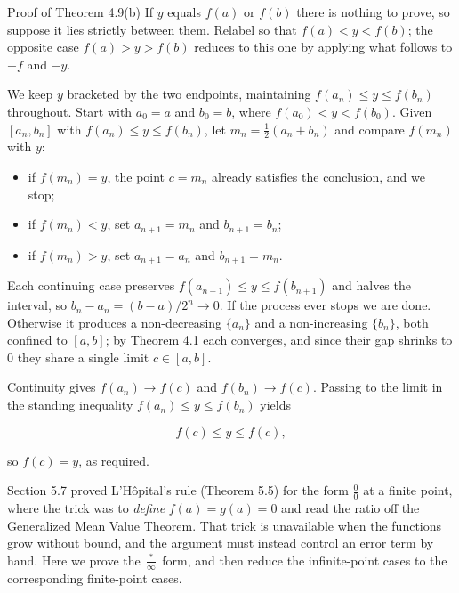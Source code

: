 \documentclass[a4paper,12pt,oneside]{memoir}
\begin{document}
\begin{envproof}{Proof of Theorem 4.9(b)}{}{}
If \(y\) equals \(f(a)\) or \(f(b)\) there is nothing to prove, so suppose it lies strictly between them. Relabel so that \(f(a) < y < f(b)\); the opposite case \(f(a) > y > f(b)\) reduces to this one by applying what follows to \(-f\) and \(-y\).

We keep \(y\) bracketed by the two endpoints, maintaining \(f(a_{n}) \le y \le f(b_{n})\) throughout. Start with \(a_{0} = a\) and \(b_{0} = b\), where \(f(a_{0}) < y < f(b_{0})\). Given \([a_{n}, b_{n}]\) with \(f(a_{n}) \le y \le f(b_{n})\), let \(m_{n} = \tfrac{1}{2}(a_{n} + b_{n})\) and compare \(f(m_{n})\) with \(y\):

\begin{itemize}
  \item if \(f(m_{n}) = y\), the point \(c = m_{n}\) already satisfies the conclusion, and we stop;
  \item if \(f(m_{n}) < y\), set \(a_{n+1} = m_{n}\) and \(b_{n+1} = b_{n}\);
  \item if \(f(m_{n}) > y\), set \(a_{n+1} = a_{n}\) and \(b_{n+1} = m_{n}\).
\end{itemize}
Each continuing case preserves \(f(a_{n+1}) \le y \le f(b_{n+1})\) and halves the interval, so \(b_{n} - a_{n} = (b - a)/2^{n} \to 0\). If the process ever stops we are done. Otherwise it produces a non-decreasing \(\{a_{n}\}\) and a non-increasing \(\{b_{n}\}\), both confined to \([a, b]\); by Theorem 4.1 each converges, and since their gap shrinks to \(0\) they share a single limit \(c \in [a, b]\).

Continuity gives \(f(a_{n}) \to f(c)\) and \(f(b_{n}) \to f(c)\). Passing to the limit in the standing inequality \(f(a_{n}) \le y \le f(b_{n})\) yields

\[ f(c) \le y \le f(c), \]

so \(f(c) = y\), as required. \qedmark
\end{envproof}

Section 5.7 proved L’Hôpital’s rule (Theorem 5.5) for the form \(\tfrac{0}{0}\) at a finite point, where the trick was to \emph{define} \(f(a) = g(a) = 0\) and read the ratio off the Generalized Mean Value Theorem. That trick is unavailable when the functions grow without bound, and the argument must instead control an error term by hand. Here we prove the \(\tfrac{\ast}{\infty}\) form, and then reduce the infinite-point cases to the corresponding finite-point cases.
\end{document}
